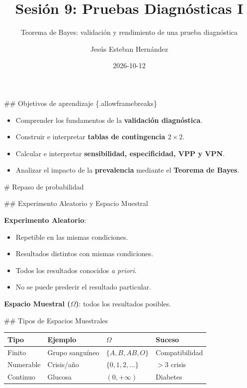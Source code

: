 \documentclass[
  ignorenonframetext,
  aspectratio=169,
]{beamer}
\title{\texorpdfstring{Sesión 9: Pruebas Diagnósticas
I}{Sesión 9: Pruebas Diagnósticas I}}
\subtitle{\texorpdfstring{Teorema de Bayes: validación y rendimiento de
una prueba
diagnóstica}{Teorema de Bayes: validación y rendimiento de una prueba diagnóstica}}
\author{Jesús Esteban Hernández}
\date{2026-10-12}
\providecommand{\tightlist}{%
  \setlength{\itemsep}{0pt}\setlength{\parskip}{0pt}}
\begin{document}
\frame{\titlepage}


\begin{frame}
\#\# Objetivos de aprendizaje \{.allowframebreaks\}

\begin{itemize}
\tightlist
\item
  Comprender los fundamentos de la \textbf{validación diagnóstica}.
\item
  Construir e interpretar \textbf{tablas de contingencia
  \(2 \times 2\)}.
\item
  Calcular e interpretar \textbf{sensibilidad, especificidad, VPP y
  VPN}.
\item
  Analizar el impacto de la \textbf{prevalencia} mediante el
  \textbf{Teorema de Bayes}.
\end{itemize}
\end{frame}

\begin{frame}
\# Repaso de probabilidad

\#\# Experimento Aleatorio y Espacio Muestral

\textbf{Experimento Aleatorio}:

\begin{itemize}
\tightlist
\item
  Repetible en las mismas condiciones.
\item
  Resultados distintos con mismas condiciones.
\item
  Todos los resultados conocidos \emph{a priori}.
\item
  No se puede predecir el resultado particular.
\end{itemize}

\textbf{Espacio Muestral (\(\Omega\))}: todos los resultados posibles.
\end{frame}

\begin{frame}
\#\# Tipos de Espacios Muestrales

\begin{tabular}{llll}
\toprule
Tipo & Ejemplo & $\Omega$ & Suceso \\
\midrule
Finito & Grupo sanguíneo & $\{A,B,AB,O\}$ & Compatibilidad \\
Numerable & Crisis/año & $\{0,1,2,\dots\}$ & $>3$ crisis \\
Continuo & Glucosa & $(0,+\infty)$ & Diabetes \\
\bottomrule
\end{tabular}
\end{frame}
\end{document}
